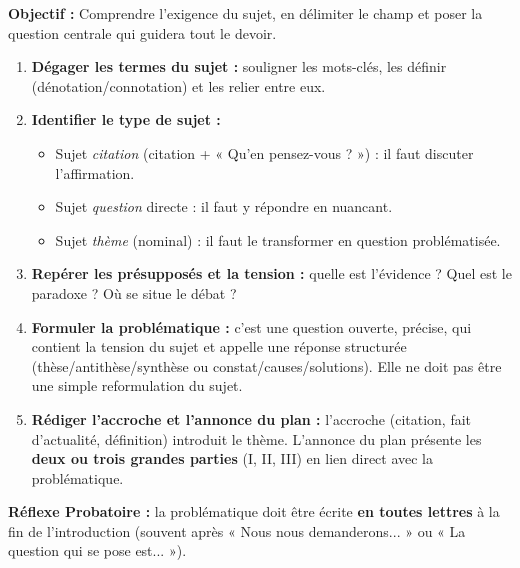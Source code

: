 \documentclass[11pt]{article}
\newcommand{\cle}[1]{{\popxbold\color{popdark}#1}}
\begin{document}
\begin{methode}
    \textbf{Objectif :} Comprendre l'exigence du sujet, en délimiter le champ et poser la question centrale qui guidera tout le devoir.
    \begin{enumerate}
        \item \textbf{Dégager les termes du sujet :} souligner les mots-clés, les définir (dénotation/connotation) et les relier entre eux.
        \item \textbf{Identifier le type de sujet :}
            \begin{itemize}
                \item Sujet \emph{citation} (citation + « Qu'en pensez-vous ? ») : il faut discuter l'affirmation.
                \item Sujet \emph{question} directe : il faut y répondre en nuancant.
                \item Sujet \emph{thème} (nominal) : il faut le transformer en question problématisée.
            \end{itemize}
        \item \textbf{Repérer les présupposés et la tension :} quelle est l'évidence ? Quel est le paradoxe ? Où se situe le débat ?
        \item \textbf{Formuler la problématique :} c'est une \cle{question ouverte}, précise, qui contient la tension du sujet et appelle une réponse structurée (thèse/antithèse/synthèse ou constat/causes/solutions). Elle ne doit pas être une simple reformulation du sujet.
        \item \textbf{Rédiger l'accroche et l'annonce du plan :} l'accroche (citation, fait d'actualité, définition) introduit le thème. L'annonce du plan présente les \textbf{deux ou trois grandes parties} (I, II, III) en lien direct avec la problématique.
    \end{enumerate}
    \textbf{Réflexe Probatoire :} la problématique doit être écrite \textbf{en toutes lettres} à la fin de l'introduction (souvent après « Nous nous demanderons... » ou « La question qui se pose est... »).
\end{methode}
\end{document}
